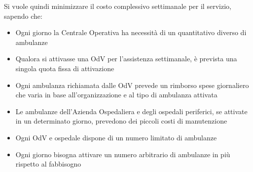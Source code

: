 \newline \newline
Si vuole quindi minimizzare il costo complessivo settimanale per il servizio, sapendo che:
\begin{itemize}
    \item Ogni giorno la Centrale Operativa ha necessità di un quantitativo diverso di ambulanze
    \item Qualora si attivasse una OdV per l'assistenza settimanale, è prevista una singola quota fissa di attivazione
    \item Ogni ambulanza richiamata dalle OdV prevede un rimborso spese giornaliero che varia in base all'organizzazione e al tipo di ambulanza attivata
    \item Le ambulanze dell'Azienda Ospedaliera e degli ospedali periferici, se attivate in un determinato giorno, prevedono dei piccoli costi di manutenzione
    \item Ogni OdV e ospedale dispone di un numero limitato di ambulanze
    \item Ogni giorno bisogna attivare un numero arbitrario di ambulanze in più rispetto al fabbisogno
\end{itemize}